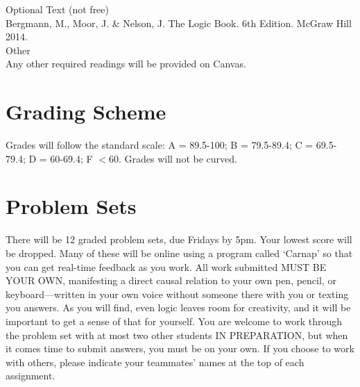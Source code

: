 \documentclass[letterpaper]{inzane_syllabus} %
\begin{document}
{\color{myCOLOR} Optional Text (not free)}\\
Bergmann, M., Moor, J. \& Nelson, J. The Logic Book. 6th Edition. McGraw Hill 2014. \\

{\color{myCOLOR} Other}\\
Any other required readings will be provided on Canvas.

\vspace{0.5cm}
\section{Grading Scheme}

\begin{twentyshort}
\end{twentyshort}

Grades will follow the standard scale: A = 89.5-100; B = 79.5-89.4; C = 69.5-79.4; D = 60-69.4; F  $<$60. Grades will not be curved.


\vspace{0.5cm}
\section{Problem Sets}

There will be 12 graded problem sets, due Fridays by 5pm.
Your lowest score will be dropped.
Many of these will be online using a program called ‘Carnap’ so that you can get real-time feedback as you work.
All work submitted MUST BE YOUR OWN, manifesting a direct causal relation to your own pen, pencil, or keyboard—written in your own voice without someone there with you or texting you answers.
As you will find, even logic leaves room for creativity, and it will be important to get a sense of that for yourself.
You are welcome to work through the problem set with at most two other students IN PREPARATION, but when it comes time to submit answers, you must be on your own.
If you choose to work with others, please indicate your teammates’ names at the top of each assignment.
\end{document}
